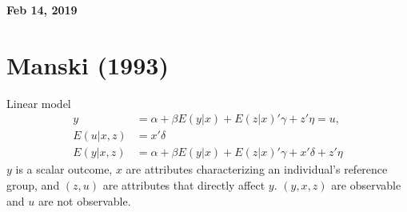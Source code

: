 \documentclass[11pt]{article}
\begin{document}
%

\newcommand{\Ito}{$It\hat{o}$'$s~Lemma$}

\newcommand\ind{\stackrel{\rm ind}{\sim}}
\newcommand\iid{\stackrel{\rm iid}{\sim}}
\renewcommand\c{\mathbf{c}}
\newcommand\y{\mathbf{y}}
\newcommand\z{\mathbf{z}}
\renewcommand\P{\mathbf{P}}
\newcommand\W{\mathbf{W}}
\newcommand\X{\mathbf{X}}
\newcommand\Y{\mathbf{Y}}
\newcommand\Z{\mathbf{Z}}
\newcommand\J{{\cal J}}
\newcommand\B{{\cal B}}
\newcommand\K{{\cal K}}
\newcommand\N{{\rm N}}
\newcommand\bs{\boldsymbol}
\newcommand\bth{\bs\theta}
\newcommand\bbe{\bs\beta}
\renewcommand\*{^\star}

\def\spacingset#1{\renewcommand{\baselinestretch}%
{#1}\small\normalsize} \spacingset{1}



  \bigskip
  \bigskip
  \bigskip
  \begin{center}
    {\LARGE\bf Feb 14, 2019 }
  \end{center}
  \medskip



\spacingset{1.45}



\section{Manski (1993)}
Linear model
\begin{align}
y &= \alpha +\beta E(y | x) + E(z|x)'\gamma + z'\eta = u , \\
E(u|x,z) &= x'\delta \nonumber \\
E(y|x,z) &= \alpha + \beta E(y|x) + E(z|x)'\gamma + x'\delta + z'\eta
\end{align}
$y$ is a scalar outcome, $x$ are attributes characterizing an individual's reference group, and $(z,u)$ are attributes that directly affect $y$. $(y,x,z)$ are observable and $u$ are not observable.
\end{document}
